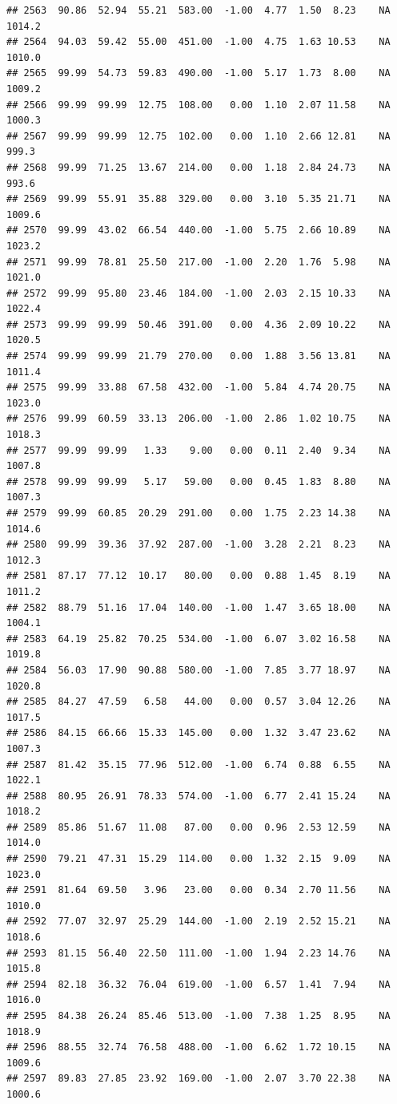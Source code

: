 \documentclass{article}\usepackage{graphicx, color}
\makeatletter
\newenvironment{kframe}{%
 \def\at@end@of@kframe{}%
 \ifinner\ifhmode%
  \def\at@end@of@kframe{\end{minipage}}%
  \begin{minipage}{\columnwidth}%
 \fi\fi%
 \def\FrameCommand##1{\hskip\@totalleftmargin \hskip-\fboxsep
 \colorbox{shadecolor}{##1}\hskip-\fboxsep
     \hskip-\linewidth \hskip-\@totalleftmargin \hskip\columnwidth}%
 \MakeFramed {\advance\hsize-\width
   \@totalleftmargin\z@ \linewidth\hsize
   \@setminipage}}%
 {\par\unskip\endMakeFramed%
 \at@end@of@kframe}
\newenvironment{knitrout}{}{} %
\makeatother
\begin{document}
\begin{knitrout}
\begin{kframe}
\begin{verbatim}
## 2563  90.86  52.94  55.21  583.00  -1.00  4.77  1.50  8.23    NA 1014.2
## 2564  94.03  59.42  55.00  451.00  -1.00  4.75  1.63 10.53    NA 1010.0
## 2565  99.99  54.73  59.83  490.00  -1.00  5.17  1.73  8.00    NA 1009.2
## 2566  99.99  99.99  12.75  108.00   0.00  1.10  2.07 11.58    NA 1000.3
## 2567  99.99  99.99  12.75  102.00   0.00  1.10  2.66 12.81    NA  999.3
## 2568  99.99  71.25  13.67  214.00   0.00  1.18  2.84 24.73    NA  993.6
## 2569  99.99  55.91  35.88  329.00   0.00  3.10  5.35 21.71    NA 1009.6
## 2570  99.99  43.02  66.54  440.00  -1.00  5.75  2.66 10.89    NA 1023.2
## 2571  99.99  78.81  25.50  217.00  -1.00  2.20  1.76  5.98    NA 1021.0
## 2572  99.99  95.80  23.46  184.00  -1.00  2.03  2.15 10.33    NA 1022.4
## 2573  99.99  99.99  50.46  391.00   0.00  4.36  2.09 10.22    NA 1020.5
## 2574  99.99  99.99  21.79  270.00   0.00  1.88  3.56 13.81    NA 1011.4
## 2575  99.99  33.88  67.58  432.00  -1.00  5.84  4.74 20.75    NA 1023.0
## 2576  99.99  60.59  33.13  206.00  -1.00  2.86  1.02 10.75    NA 1018.3
## 2577  99.99  99.99   1.33    9.00   0.00  0.11  2.40  9.34    NA 1007.8
## 2578  99.99  99.99   5.17   59.00   0.00  0.45  1.83  8.80    NA 1007.3
## 2579  99.99  60.85  20.29  291.00   0.00  1.75  2.23 14.38    NA 1014.6
## 2580  99.99  39.36  37.92  287.00  -1.00  3.28  2.21  8.23    NA 1012.3
## 2581  87.17  77.12  10.17   80.00   0.00  0.88  1.45  8.19    NA 1011.2
## 2582  88.79  51.16  17.04  140.00  -1.00  1.47  3.65 18.00    NA 1004.1
## 2583  64.19  25.82  70.25  534.00  -1.00  6.07  3.02 16.58    NA 1019.8
## 2584  56.03  17.90  90.88  580.00  -1.00  7.85  3.77 18.97    NA 1020.8
## 2585  84.27  47.59   6.58   44.00   0.00  0.57  3.04 12.26    NA 1017.5
## 2586  84.15  66.66  15.33  145.00   0.00  1.32  3.47 23.62    NA 1007.3
## 2587  81.42  35.15  77.96  512.00  -1.00  6.74  0.88  6.55    NA 1022.1
## 2588  80.95  26.91  78.33  574.00  -1.00  6.77  2.41 15.24    NA 1018.2
## 2589  85.86  51.67  11.08   87.00   0.00  0.96  2.53 12.59    NA 1014.0
## 2590  79.21  47.31  15.29  114.00   0.00  1.32  2.15  9.09    NA 1023.0
## 2591  81.64  69.50   3.96   23.00   0.00  0.34  2.70 11.56    NA 1010.0
## 2592  77.07  32.97  25.29  144.00  -1.00  2.19  2.52 15.21    NA 1018.6
## 2593  81.15  56.40  22.50  111.00  -1.00  1.94  2.23 14.76    NA 1015.8
## 2594  82.18  36.32  76.04  619.00  -1.00  6.57  1.41  7.94    NA 1016.0
## 2595  84.38  26.24  85.46  513.00  -1.00  7.38  1.25  8.95    NA 1018.9
## 2596  88.55  32.74  76.58  488.00  -1.00  6.62  1.72 10.15    NA 1009.6
## 2597  89.83  27.85  23.92  169.00  -1.00  2.07  3.70 22.38    NA 1000.6

\end{verbatim}
\end{kframe}
\end{knitrout}
\end{document}
